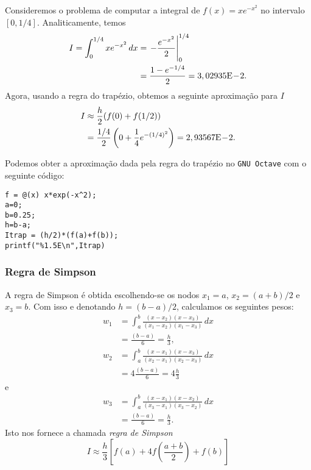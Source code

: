 \begin{ex}\label{ex:int_trap}
  Consideremos o problema de computar a integral de $f(x)=xe^{-x^2}$ no intervalo $[0, 1/4]$. Analiticamente, temos
  \begin{align}
    I = \int_0^{1/4} xe^{-x^2}\,dx &= \left. -\frac{e^{-x^2}}{2} \right|_0^{1/4}\\
    &= \frac{1-e^{-1/4}}{2} = 3,02935\mathrm{E}\!-\!2.
  \end{align}
Agora, usando a regra do trapézio, obtemos a seguinte aproximação para $I$
\begin{align}
  I &\approx \frac{h}{2}(f(0) + f(1/2))\\
  &= \frac{1/4}{2}\left(0 + \frac{1}{4}e^{-(1/4)^2}\right) = 2,93567\mathrm{E}\!-\!2.
\end{align}

\ifisoctave
Podemos obter a aproximação dada pela regra do trapézio no \verb+GNU Octave+ com o seguinte código:
\begin{verbatim}
f = @(x) x*exp(-x^2);
a=0;
b=0.25;
h=b-a;
Itrap = (h/2)*(f(a)+f(b));
printf("%1.5E\n",Itrap)
\end{verbatim}
\fi
\end{ex}

\subsubsection{Regra de Simpson}

A regra de Simpson é obtida escolhendo-se os nodos $x_1=a$, $x_2=(a+b)/2$ e $x_3=b$. Com isso e denotando $h=(b-a)/2$, calculamos os seguintes pesos:
\begin{align}
  w_1 &= \int_a^b\frac{(x-x_2)(x-x_3)}{(x_1-x_2)(x_1-x_3)}\,dx\\
  &= \frac{(b-a)}{6} = \frac{h}{3},
\end{align}
\begin{align}
  w_2 &= \int_a^b\frac{(x-x_1)(x-x_3)}{(x_2-x_1)(x_2-x_3)}\,dx\\
  &= 4\frac{(b-a)}{6} = 4\frac{h}{3}
\end{align}
e
\begin{align}
  w_3 &= \int_a^b\frac{(x-x_1)(x-x_2)}{(x_3-x_1)(x_3-x_2)}\,dx\\
  &= \frac{(b-a)}{6} = \frac{h}{3}.
\end{align}
Isto nos fornece a chamada \emph{regra de Simpson}
\begin{equation}\label{eq:aux_Simpson}
  I \approx \frac{h}{3}\left[f(a) + 4f\left(\frac{a+b}{2}\right) + f(b)\right]
\end{equation}

